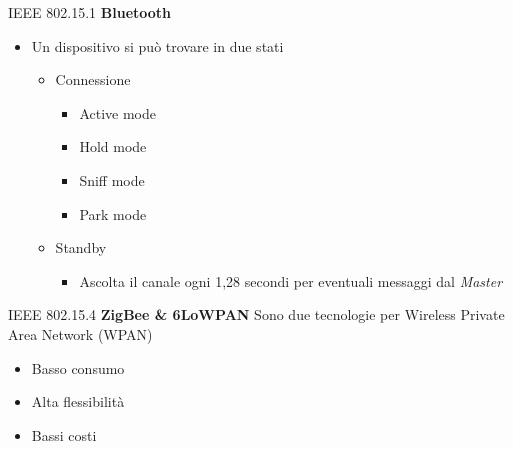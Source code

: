 \begin{frame}{IEEE 802.15.1}
\textbf{Bluetooth}
\begin{itemize}[<+- | alert@+>]
	\item Un dispositivo si può trovare in due stati
	\begin{itemize}[<+- | alert@+>]
		\item Connessione
		\begin{itemize}[<+- | alert@+>]
			\item Active mode
			\item Hold mode
			\item Sniff mode
			\item Park mode
		\end{itemize}
		\item Standby
		\begin{itemize}[<+- | alert@+>]
			\item Ascolta il canale ogni 1,28 secondi per eventuali messaggi dal \textit{Master}
		\end{itemize}
	\end{itemize}
\end{itemize}
\end{frame}

\begin{frame}{IEEE 802.15.4}
\textbf{ZigBee \& 6LoWPAN}
	\newline
	Sono due tecnologie per Wireless Private Area Network (WPAN)
	\begin{itemize}[<+- | alert@+>]
		\item Basso consumo
		\item Alta flessibilità
		\item Bassi costi
	\end{itemize}
\end{frame}

